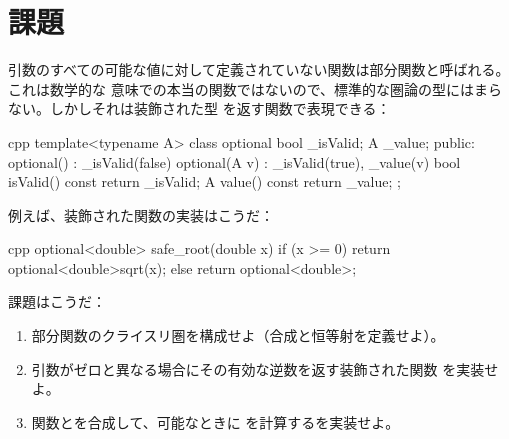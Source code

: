 \section{課題}

引数のすべての可能な値に対して定義されていない関数は部分関数と呼ばれる。これは数学的な
意味での本当の関数ではないので、標準的な圏論の型にはまらない。しかしそれは装飾された型
を返す関数で表現できる：

\begin{snip}{cpp}
template<typename A>
class optional {
    bool _isValid;
    A _value;
public:
    optional()    : _isValid(false) {}
    optional(A v) : _isValid(true), _value(v) {}
    bool isValid() const { return _isValid; }
    A value() const { return _value; }
};
\end{snip}
例えば、装飾された関数の実装はこうだ：

\begin{snip}{cpp}
optional<double> safe_root(double x) {
    if (x >= 0) return optional<double>{sqrt(x)};
    else return optional<double>{};
}
\end{snip}
課題はこうだ：

\begin{enumerate}
  \tightlist
  \item
        部分関数のクライスリ圏を構成せよ（合成と恒等射を定義せよ）。
  \item
        引数がゼロと異なる場合にその有効な逆数を返す装飾された関数
        を実装せよ。
  \item
        関数とを合成して、可能なときに
        を計算するを実装せよ。
\end{enumerate}
